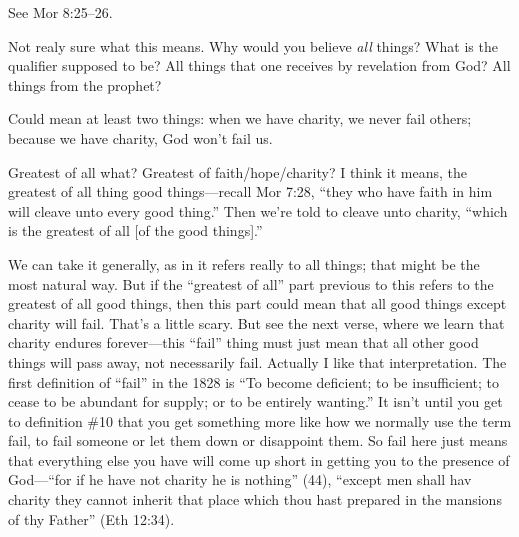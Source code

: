 \begin{compactdesc}
		\item[43--44$\vert$]
		\begin{compactdesc}
		\item[meek and lowly of/in heart] See Mor 8:25--26.
		\end{compactdesc}
		
		\item[45$\vert$]
		\begin{compactdesc}
		\item[believeth all things] Not realy sure what this means. Why would you believe \textit{all} things? What is the qualifier supposed to be? All things that one receives by revelation from God? All things from the prophet?
		\end{compactdesc}
		
		\item[46$\vert$]
		\begin{compactdesc}
		\item[charity never faileth] Could mean at least two things: when we have charity, we never fail others; because we have charity, God won't fail us.
		\item[greatest of all] Greatest of all what? Greatest of faith/hope/charity? I think it means, the greatest of all thing good things---recall Mor 7:28, ``they who have faith in him will cleave unto every good thing.'' Then we're told to cleave unto charity, ``which is the greatest of all [of the good things].''
		\item[for all things must fail] We can take it generally, as in it refers really to all things; that might be the most natural way. But if the ``greatest of all'' part previous to this refers to the greatest of all good things, then this part could mean that all good things except charity will fail. That's a little scary. But see the next verse, where we learn that charity endures forever---this ``fail'' thing must just mean that all other good things will pass away, not necessarily fail. Actually I like that interpretation. The first definition of ``fail'' in the 1828 is ``To become deficient; to be insufficient; to cease to be abundant for supply; or to be entirely wanting.'' It isn't until you get to definition \#10 that you get something more like how we normally use the term fail, to fail someone or let them down or disappoint them. So fail here just means that everything else you have will come up short in getting you to the presence of God---``for if he have not charity he is nothing'' (44), ``except men shall hav charity they cannot inherit that place which thou hast prepared in the mansions of thy Father'' (Eth 12:34).
		\end{compactdesc}
		

\end{compactdesc}
